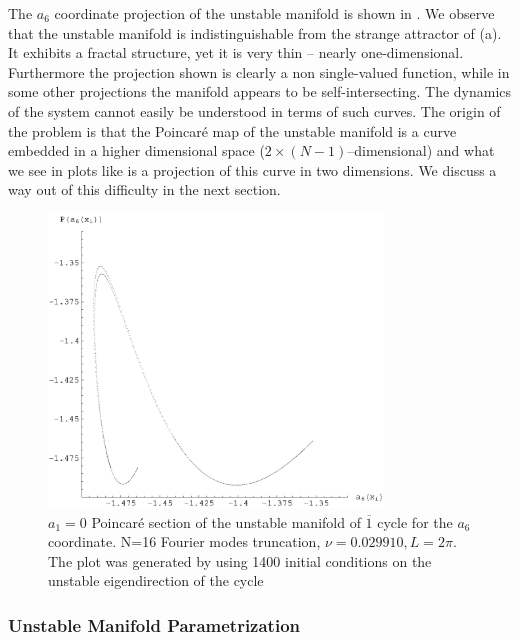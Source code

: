 \documentclass[pre,preprint,groupedaddress,showpacs,showkeys]{revtex4}
\begin{document}
 The $a_6$ coordinate projection of the
 unstable manifold is shown in .
 We observe that the unstable manifold is indistinguishable from the
 strange attractor of (a). It exhibits a fractal structure, yet it is very thin -- nearly
 one-dimensional. Furthermore the projection shown is clearly
 a non single-valued function, while in some other projections
 the manifold appears to be self-intersecting. The dynamics of the system cannot easily be
 understood in terms of such curves. The origin of the problem is that
 the Poincar\'e map of the unstable manifold is a curve embedded in a
 higher dimensional space  ($ 2\times(N-1)$--dimensional) and what we see in plots like
  is a projection of this curve in two
 dimensions. We discuss a way out of this difficulty in the
 next section.

 \begin{figure}[b!]
     \includegraphics[width=3.5in]{figs/manifold.eps}
     \caption{ $a_1=0$ Poincar\'e section of the unstable manifold of $ \overline{1}$   cycle  for the $a_6$ coordinate.
     N=16 Fourier modes truncation, $\nu=0.029910, L=2\pi$. The
     plot was generated by using 1400 initial conditions on the
     unstable eigendirection of the cycle 
     }
 \label{fig:Manifold}
 \end{figure}



 \subsubsection{Unstable Manifold Parametrization}
\end{document}
